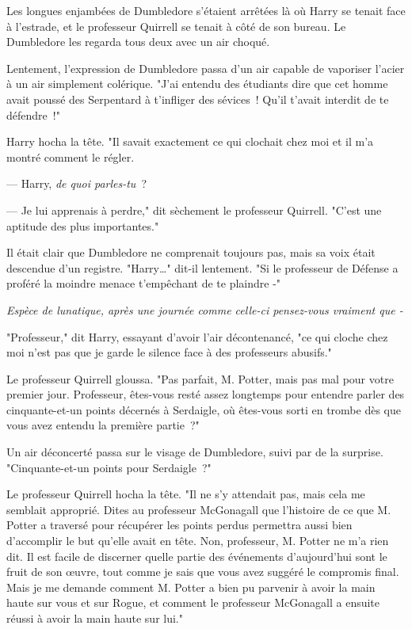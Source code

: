 Les longues enjambées de Dumbledore s'étaient arrêtées là où Harry se tenait face à l'estrade, et le professeur Quirrell se tenait à côté de son bureau. Le Dumbledore les regarda tous deux avec un air choqué.

Lentement, l'expression de Dumbledore passa d'un air capable de vaporiser l'acier à un air simplement colérique. "J'ai entendu des étudiants dire que cet homme avait poussé des Serpentard à t'infliger des sévices~! Qu'il t'avait interdit de te défendre~!"

Harry hocha la tête. "Il savait exactement ce qui clochait chez moi et il m'a montré comment le régler.

--- Harry, \emph{de quoi parles-tu}~?

--- Je lui apprenais à perdre," dit sèchement le professeur Quirrell. "C'est une aptitude des plus importantes."

Il était clair que Dumbledore ne comprenait toujours pas, mais sa voix était descendue d'un registre. "Harry…" dit-il lentement. "Si le professeur de Défense a proféré la moindre menace t'empêchant de te plaindre -"

\emph{Espèce de lunatique, après une journée comme celle-ci pensez-vous vraiment que -}

"Professeur," dit Harry, essayant d'avoir l'air décontenancé, "ce qui cloche chez moi n'est pas que je garde le silence face à des professeurs abusifs."

Le professeur Quirrell gloussa. "Pas parfait, M. Potter, mais pas mal pour votre premier jour. Professeur, êtes-vous resté assez longtemps pour entendre parler des cinquante-et-un points décernés à Serdaigle, où êtes-vous sorti en trombe dès que vous avez entendu la première partie~?"

Un air déconcerté passa sur le visage de Dumbledore, suivi par de la surprise. "Cinquante-et-un points pour Serdaigle~?"

Le professeur Quirrell hocha la tête. "Il ne s'y attendait pas, mais cela me semblait approprié. Dites au professeur McGonagall que l'histoire de ce que M. Potter a traversé pour récupérer les points perdus permettra aussi bien d'accomplir le but qu'elle avait en tête. Non, professeur, M. Potter ne m'a rien dit. Il est facile de discerner quelle partie des événements d'aujourd'hui sont le fruit de son œuvre, tout comme je sais que vous avez suggéré le compromis final. Mais je me demande comment M. Potter a bien pu parvenir à avoir la main haute sur vous et sur Rogue, et comment le professeur McGonagall a ensuite réussi à avoir la main haute sur lui."

